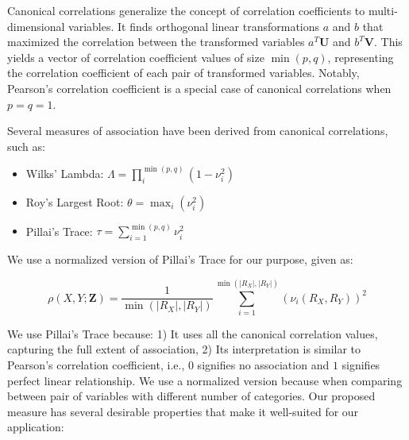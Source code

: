 \documentclass{uai2025} %
\begin{document}
Canonical correlations generalize the concept of correlation coefficients to
multi-dimensional variables. It finds orthogonal linear transformations $ a $
and $ b $ that maximized the correlation between the transformed variables $
a^T \bm{U} $ and $ b^T \bm{V} $. This yields a vector of correlation
coefficient values of size $ \min(p, q) $, representing the correlation
coefficient of each pair of transformed variables. Notably, Pearson's
correlation coefficient is a special case of canonical correlations when $ p =
q = 1 $.

Several measures of association have been derived from canonical correlations, such as:
\begin{itemize}
	\item Wilks' Lambda: $\Lambda = \prod_{i}^{\min(p, q)} (1 - \nu_i^2) $
	\item Roy's Largest Root: $ \theta = \max_i(\nu_i^2) $
	\item Pillai's Trace: $ \tau = \sum_{i=1}^{\min(p, q)} \nu_i^2 $
\end{itemize}

We use a normalized version of Pillai's Trace for our purpose, given as:

\begin{equation}
	\rho(X, Y; \bm{Z}) = \frac{1}{\min(\rvert R_X \rvert, \rvert R_Y \rvert)}
	\sum_{i=1}^{\min(\rvert R_X \rvert, \rvert R_Y \rvert)} (\nu_i(R_X, R_Y))^2
\end{equation}


We use Pillai's Trace because: 1) It uses all the canonical correlation values,
capturing the full extent of association, 2) Its interpretation is similar to
Pearson's correlation coefficient, i.e., $ 0 $ signifies no association and $ 1
$ signifies perfect linear relationship. We use a normalized version because
when comparing between pair of variables with different number of categories.
Our proposed measure has several desirable properties that make it well-suited
for our application:
\end{document}
